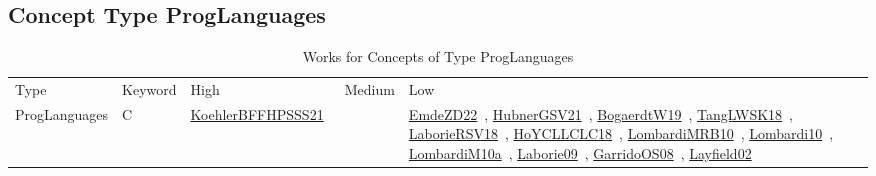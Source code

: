 \clearpage
\subsection{Concept Type ProgLanguages}
\label{sec:ProgLanguages}
{\scriptsize
\begin{longtable}{lp{3cm}>{\raggedright\arraybackslash}p{6cm}>{\raggedright\arraybackslash}p{6cm}>{\raggedright\arraybackslash}p{8cm}}
\rowcolor{white}\caption{Works for Concepts of Type ProgLanguages}\\ \toprule
\rowcolor{white}Type & Keyword & High & Medium & Low\\ \midrule\endhead
\bottomrule
\endfoot
ProgLanguages & C  & \href{works/KoehlerBFFHPSSS21.pdf}{KoehlerBFFHPSSS21}~\cite{KoehlerBFFHPSSS21} &  & \href{works/EmdeZD22.pdf}{EmdeZD22}~\cite{EmdeZD22}, \href{works/HubnerGSV21.pdf}{HubnerGSV21}~\cite{HubnerGSV21}, \href{works/BogaerdtW19.pdf}{BogaerdtW19}~\cite{BogaerdtW19}, \href{works/TangLWSK18.pdf}{TangLWSK18}~\cite{TangLWSK18}, \href{works/LaborieRSV18.pdf}{LaborieRSV18}~\cite{LaborieRSV18}, \href{works/HoYCLLCLC18.pdf}{HoYCLLCLC18}~\cite{HoYCLLCLC18}, \href{works/LombardiMRB10.pdf}{LombardiMRB10}~\cite{LombardiMRB10}, \href{works/Lombardi10.pdf}{Lombardi10}~\cite{Lombardi10}, \href{works/LombardiM10a.pdf}{LombardiM10a}~\cite{LombardiM10a}, \href{works/Laborie09.pdf}{Laborie09}~\cite{Laborie09}, \href{works/GarridoOS08.pdf}{GarridoOS08}~\cite{GarridoOS08}, \href{works/Layfield02.pdf}{Layfield02}~\cite{Layfield02}\\

\end{longtable}}
